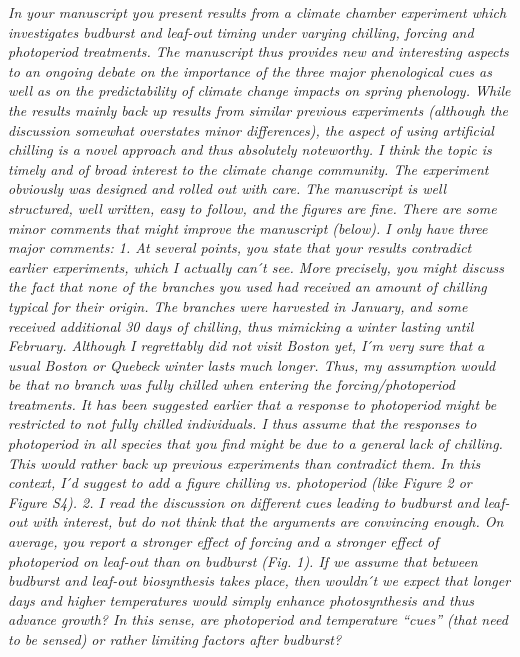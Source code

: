 \documentclass[11pt,a4paper]{article}
\begin{document}
\emph{In your manuscript you present results from a climate chamber experiment which investigates
budburst and leaf-out timing under varying chilling, forcing and photoperiod treatments.
The manuscript thus provides new and interesting aspects to an ongoing debate on the
importance of the three major phenological cues as well as on the predictability of climate
change impacts on spring phenology. While the results mainly back up results from similar
previous experiments (although the discussion somewhat overstates minor differences), the
aspect of using artificial chilling is a novel approach and thus absolutely noteworthy.
I think the topic is timely and of broad interest to the climate change community. The
experiment obviously was designed and rolled out with care. The manuscript is well
structured, well written, easy to follow, and the figures are fine.
There are some minor comments that might improve the manuscript (below). I only have three
major comments:
1.      At several points, you state that your results contradict earlier experiments, which
I actually can ́t see. More precisely, you might discuss the fact that none of the branches
you used had received an amount of chilling typical for their origin. The branches were
harvested in January, and some received additional 30 days of chilling, thus mimicking a
winter lasting until February. Although I regrettably did not visit Boston yet, I ́m very sure
that a usual Boston or Quebeck winter lasts much longer. Thus, my assumption would be that no
branch was fully chilled when entering the forcing/photoperiod treatments. It has been
suggested earlier that a response to photoperiod might be restricted to not fully chilled
individuals. I thus assume that the responses to photoperiod in all species that you find
might be due to a general lack of chilling. This would rather back up previous experiments
than contradict them.
In this context, I ́d suggest to add a figure chilling vs. photoperiod (like Figure 2 or
Figure S4).
2.      I read the discussion on different cues leading to budburst and leaf-out with
interest, but do not think that the arguments are convincing enough. On average, you report a
stronger effect of forcing and a stronger effect of photoperiod on leaf-out than on budburst
(Fig. 1). If we assume that between budburst and leaf-out biosynthesis takes place, then
wouldn ́t we expect that longer days and higher temperatures would simply enhance
photosynthesis and thus advance growth? In this sense, are photoperiod and temperature “cues”
(that need to be sensed) or rather limiting factors after budburst?
}
\end{document}
